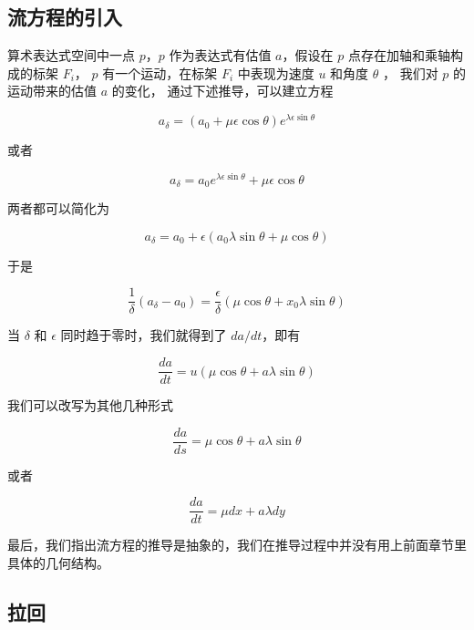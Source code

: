 \documentclass[a4paper,12pt]{article}
\numberwithin{definition}{section}
\numberwithin{lemma}{section}
\numberwithin{proposition}{section}
\numberwithin{theorem}{section}
\numberwithin{grammar}{section}
\numberwithin{program}{section}
\numberwithin{convention}{section}
\numberwithin{corollary}{section}
\begin{document}
\subsection{流方程的引入}

算术表达式空间中一点 $p$，$p$ 作为表达式有估值 $a$，假设在 $p$ 点存在加轴和乘轴构成的标架 $F_i$，
$p$ 有一个运动，在标架 $F_i$ 中表现为速度 $u$ 和角度 $\theta$ ， 我们对 $p$ 的运动带来的估值 $a$ 的变化，
通过下述推导，可以建立方程

\begin{equation}
    a_{\delta} = (a_0 + \mu \epsilon \cos \theta)e^{\lambda \epsilon \sin \theta}
\end{equation}

或者

\begin{equation}
    a_{\delta} = a_0 e^{\lambda \epsilon \sin \theta} + \mu \epsilon \cos \theta
\end{equation}

两者都可以简化为

\begin{equation}
    a_{\delta} = a_0 + \epsilon (a_0 \lambda \sin \theta + \mu \cos \theta)
\end{equation}

于是

\begin{equation}
    \frac{1}{\delta} (a_{\delta} - a_0) = \frac{\epsilon}{\delta} (\mu \cos \theta + x_0 \lambda \sin \theta)
\end{equation}

当 $\delta$ 和 $\epsilon$ 同时趋于零时，我们就得到了 $da / dt$，即有

\begin{equation}
    \frac{da}{dt} = u (\mu \cos \theta + a \lambda \sin \theta)
\end{equation}

我们可以改写为其他几种形式

\begin{equation}
    \frac{da}{ds} = \mu \cos \theta + a \lambda \sin \theta
\end{equation}

或者

\begin{equation}
    \frac{da}{dt} = \mu dx + a \lambda dy
\end{equation}

最后，我们指出流方程的推导是抽象的，我们在推导过程中并没有用上前面章节里具体的几何结构。


\subsection{拉回}
\end{document}
